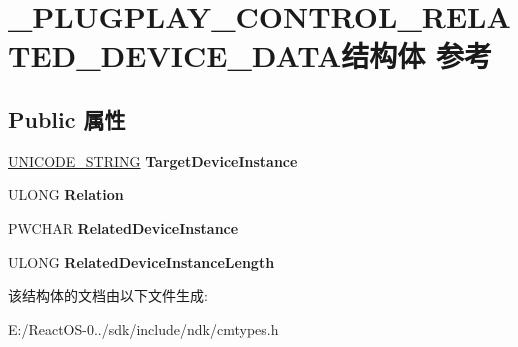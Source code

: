 \hypertarget{struct___p_l_u_g_p_l_a_y___c_o_n_t_r_o_l___r_e_l_a_t_e_d___d_e_v_i_c_e___d_a_t_a}{}\section{\+\_\+\+P\+L\+U\+G\+P\+L\+A\+Y\+\_\+\+C\+O\+N\+T\+R\+O\+L\+\_\+\+R\+E\+L\+A\+T\+E\+D\+\_\+\+D\+E\+V\+I\+C\+E\+\_\+\+D\+A\+T\+A结构体 参考}
\label{struct___p_l_u_g_p_l_a_y___c_o_n_t_r_o_l___r_e_l_a_t_e_d___d_e_v_i_c_e___d_a_t_a}
\subsection*{Public 属性}
\begin{DoxyCompactItemize}
\item 
\mbox{\label{struct___p_l_u_g_p_l_a_y___c_o_n_t_r_o_l___r_e_l_a_t_e_d___d_e_v_i_c_e___d_a_t_a_a2788a16d30c2e9273e2b6b26c736483d}} 
\hyperlink{struct___u_n_i_c_o_d_e___s_t_r_i_n_g}{U\+N\+I\+C\+O\+D\+E\+\_\+\+S\+T\+R\+I\+NG} {\bfseries Target\+Device\+Instance}
\item 
\mbox{\label{struct___p_l_u_g_p_l_a_y___c_o_n_t_r_o_l___r_e_l_a_t_e_d___d_e_v_i_c_e___d_a_t_a_adddb4fb6b06b3b818f2454504a6f4a6e}} 
U\+L\+O\+NG {\bfseries Relation}
\item 
\mbox{\label{struct___p_l_u_g_p_l_a_y___c_o_n_t_r_o_l___r_e_l_a_t_e_d___d_e_v_i_c_e___d_a_t_a_a4b7afcf54e31c30d632f8f2c01781def}} 
P\+W\+C\+H\+AR {\bfseries Related\+Device\+Instance}
\item 
\mbox{\label{struct___p_l_u_g_p_l_a_y___c_o_n_t_r_o_l___r_e_l_a_t_e_d___d_e_v_i_c_e___d_a_t_a_a4b763c6d5f526b57683e4dc9ae804461}} 
U\+L\+O\+NG {\bfseries Related\+Device\+Instance\+Length}
\end{DoxyCompactItemize}


该结构体的文档由以下文件生成\+:\begin{DoxyCompactItemize}
\item 
E\+:/\+React\+O\+S-\/0../sdk/include/ndk/cmtypes.\+h\end{DoxyCompactItemize}

